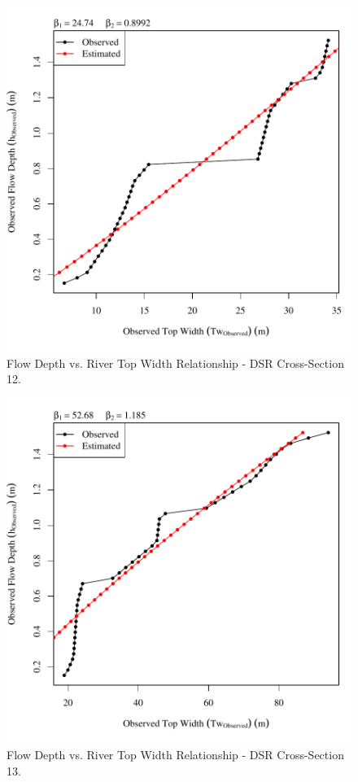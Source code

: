 \begin{center}
\begin{figure}[htbp]
	\includegraphics[width=6in]{"Figures/Results_DSR/Survey Tw vs H-Section 12"}
	\caption{Flow Depth vs. River Top Width Relationship - DSR Cross-Section 12.}
\end{figure}
\end{center}
\newpage

\begin{center}
\begin{figure}[htbp]
	\includegraphics[width=6in]{"Figures/Results_DSR/Survey Tw vs H-Section 13"}
	\caption{Flow Depth vs. River Top Width Relationship - DSR Cross-Section 13.}
\end{figure}
\end{center}
\newpage

